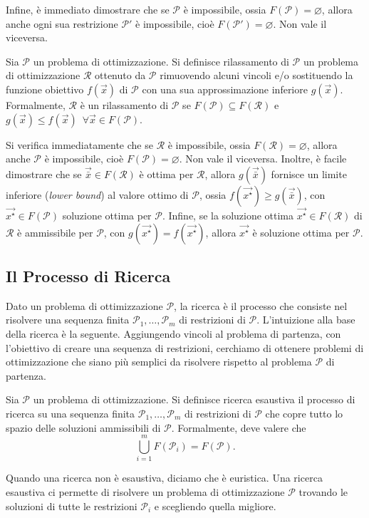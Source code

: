 Infine, è immediato dimostrare che se $\mathcal{P}$ è impossibile, ossia
$F(\mathcal{P}) = \varnothing$, allora anche ogni sua restrizione
$\mathcal{P}'$ è impossibile, cioè $F(\mathcal{P}') = \varnothing$. Non
vale il viceversa.

\begin{definition}[Rilassamento]
Sia $\mathcal{P}$ un problema di ottimizzazione. Si definisce rilassamento
di $\mathcal{P}$ un problema di ottimizzazione $\mathcal{R}$ ottenuto da
$\mathcal{P}$ rimuovendo alcuni vincoli e/o sostituendo la funzione
obiettivo $f(\vec{x})$ di $\mathcal{P}$ con una sua approssimazione
inferiore $g(\vec{x})$. Formalmente, $\mathcal{R}$ è un rilassamento di
$\mathcal{P}$ se $F(\mathcal{P}) \subseteq F(\mathcal{R})$ e $g(\vec{x})
\le f(\vec{x}) \,\,\, \forall \vec{x} \in F(\mathcal{P})$.
\end{definition}
Si verifica immediatamente che se $\mathcal{R}$ è impossibile, ossia
$F(\mathcal{R}) = \varnothing$, allora anche $\mathcal{P}$ è impossibile,
cioè $F(\mathcal{P}) = \varnothing$. Non vale il viceversa. Inoltre, è
facile dimostrare che se $\vec{\bar{x}} \in F(\mathcal{R})$ è ottima per
$\mathcal{R}$, allora $g(\vec{\bar{x}})$ fornisce un limite inferiore
(\textit{lower bound}) al valore ottimo di $\mathcal{P}$, ossia
$f(\vec{x^{\star}}) \ge g(\vec{\bar{x}})$, con $\vec{x^{\star}} \in
F(\mathcal{P})$ soluzione ottima per $\mathcal{P}$.  Infine, se la
soluzione ottima $\vec{x^{\star}} \in F(\mathcal{R})$ di $\mathcal{R}$ è
ammissibile per $\mathcal{P}$, con $g(\vec{x^{\star}}) =
f(\vec{x^{\star}})$, allora $\vec{x^{\star}}$ è soluzione ottima per
$\mathcal{P}$.

\subsection{Il Processo di Ricerca}
Dato un problema di ottimizzazione $\mathcal{P}$, la ricerca è il processo
che consiste nel risolvere una sequenza finita $\mathcal{P}_1, \ldots,
\mathcal{P}_m$ di restrizioni di $\mathcal{P}$. L'intuizione alla base
della ricerca è la seguente. Aggiungendo vincoli al problema di partenza,
con l'obiettivo di creare una sequenza di restrizioni, cerchiamo di ottenere
problemi di ottimizzazione che siano più semplici da risolvere rispetto al
problema $\mathcal{P}$ di partenza.

\begin{definition}
Sia $\mathcal{P}$ un problema di ottimizzazione. Si definisce ricerca
esaustiva il processo di ricerca su una sequenza finita
$\mathcal{P}_1, \ldots, \mathcal{P}_m$ di restrizioni di $\mathcal{P}$ che
copre tutto lo spazio delle soluzioni ammissibili di $\mathcal{P}$.
Formalmente, deve valere che
\[
    \bigcup_{i=1}^{m} F(\mathcal{P}_i) = F(\mathcal{P}).
\]
\end{definition}
Quando una ricerca non è esaustiva, diciamo che è euristica.
Una ricerca esaustiva ci permette di risolvere un problema di
ottimizzazione $\mathcal{P}$ trovando le soluzioni di tutte le restrizioni
$\mathcal{P}_i$ e scegliendo quella migliore.

